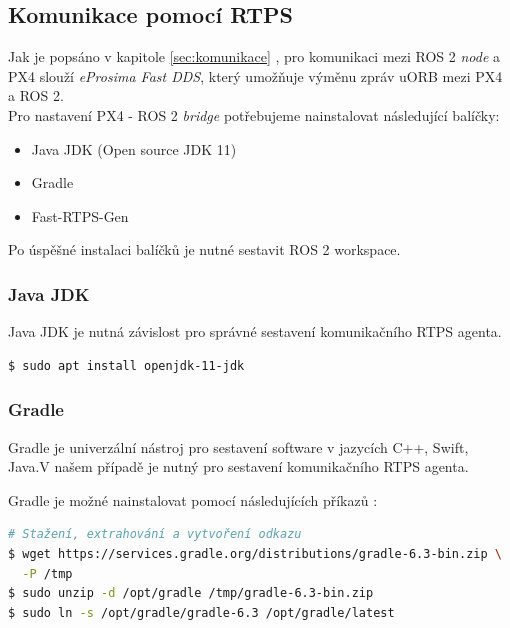 \subsection{Komunikace pomocí \acs{RTPS}}

Jak je popsáno v kapitole \ref{sec:komunikace} , pro komunikaci mezi ROS 2 \textit{node} a PX4 slouží \textit{eProsima Fast DDS}, který umožňuje výměnu zpráv uORB mezi PX4 a ROS 2.\\

Pro nastavení PX4 - ROS 2 \textit{bridge} potřebujeme nainstalovat následující balíčky:

\begin{itemize}
    \item Java JDK (Open source JDK 11)
    \item Gradle
    \item Fast-RTPS-Gen\\
\end{itemize}

Po úspěšné instalaci  balíčků je nutné sestavit ROS 2 workspace.

\subsubsection{Java JDK}

Java JDK je nutná závislost pro správné sestavení komunikačního RTPS agenta.

\begin{lstlisting}[language=bash]
$ sudo apt install openjdk-11-jdk
\end{lstlisting}

\subsubsection{Gradle}

Gradle je univerzální nástroj pro sestavení software v jazycích C++, Swift, Java.\break V našem případě je nutný pro sestavení komunikačního \acs{RTPS} agenta.

Gradle je možné nainstalovat pomocí následujících příkazů \cite{GRADLE}:

\begin{lstlisting}[language=bash]
# Stažení, extrahování a vytvoření odkazu
$ wget https://services.gradle.org/distributions/gradle-6.3-bin.zip \
  -P /tmp
$ sudo unzip -d /opt/gradle /tmp/gradle-6.3-bin.zip
$ sudo ln -s /opt/gradle/gradle-6.3 /opt/gradle/latest
\end{lstlisting}

